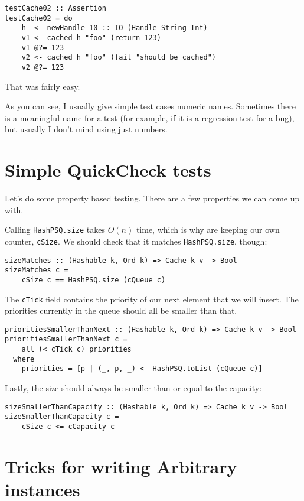 \begin{verbatim}
testCache02 :: Assertion
testCache02 = do
    h  <- newHandle 10 :: IO (Handle String Int)
    v1 <- cached h "foo" (return 123)
    v1 @?= 123
    v2 <- cached h "foo" (fail "should be cached")
    v2 @?= 123
\end{verbatim}
That was fairly easy.

As you can see, I usually give simple test cases numeric names. Sometimes there is a meaningful name for a test (for example, if it is a regression test for a bug), but usually I don't mind using just numbers.

\section{Simple QuickCheck tests}


Let's do some property based testing. There are a few properties we can come up with.

Calling \texttt{HashPSQ.size} takes $O(n)$ time, which is why are keeping our own counter, \texttt{cSize}. We should check that it matches \texttt{HashPSQ.size}, though:

\begin{verbatim}
sizeMatches :: (Hashable k, Ord k) => Cache k v -> Bool
sizeMatches c =
    cSize c == HashPSQ.size (cQueue c)
\end{verbatim}
The \texttt{cTick} field contains the priority of our next element that we will insert. The priorities currently in the queue should all be smaller than that.

\begin{verbatim}
prioritiesSmallerThanNext :: (Hashable k, Ord k) => Cache k v -> Bool
prioritiesSmallerThanNext c =
    all (< cTick c) priorities
  where
    priorities = [p | (_, p, _) <- HashPSQ.toList (cQueue c)]
\end{verbatim}
Lastly, the size should always be smaller than or equal to the capacity:

\begin{verbatim}
sizeSmallerThanCapacity :: (Hashable k, Ord k) => Cache k v -> Bool
sizeSmallerThanCapacity c =
    cSize c <= cCapacity c
\end{verbatim}


\section{Tricks for writing Arbitrary instances}

